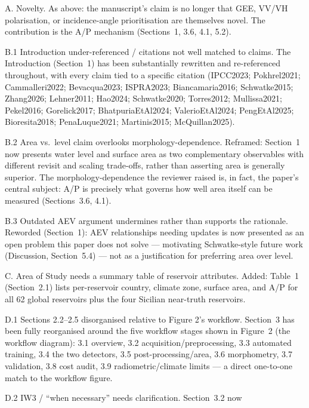 \documentclass[11pt]{article}
\begin{document}
\begin{resp}
  \item[A. Novelty.] As above: the manuscript's claim is no longer that GEE,
  VV/VH polarisation, or incidence-angle prioritisation are themselves novel.
  The contribution is the A/P mechanism (Sections~1, 3.6, 4.1, 5.2).
  \item[B.1 Introduction under-referenced / citations not well matched to
  claims.] The Introduction (Section~1) has been substantially rewritten and
  re-referenced throughout, with every claim tied to a specific citation
  (IPCC2023; Pokhrel2021; Cammalleri2022; Bevacqua2023; ISPRA2023;
  Biancamaria2016; Schwatke2015; Zhang2026; Lehner2011; Hao2024;
  Schwatke2020; Torres2012; Mullissa2021; Pekel2016; Gorelick2017;
  BhatpuriaEtAl2024; ValerioEtAl2024; PengEtAl2025; Bioresita2018;
  PenaLuque2021; Martinis2015; McQuillan2025).
  \item[B.2 Area vs.\ level claim overlooks morphology-dependence.] Reframed:
  Section~1 now presents water level and surface area as two complementary
  observables with different revisit and scaling trade-offs, rather than
  asserting area is generally superior. The morphology-dependence the
  reviewer raised is, in fact, the paper's central subject: A/P is precisely
  what governs how well area itself can be measured (Sections~3.6, 4.1).
  \item[B.3 Outdated AEV argument undermines rather than supports the
  rationale.] Reworded (Section~1): AEV relationships needing updates is now
  presented as an open problem this paper does not solve --- motivating
  Schwatke-style future work (Discussion, Section~5.4) --- not as a
  justification for preferring area over level.
  \item[C. Area of Study needs a summary table of reservoir attributes.]
  Added: Table~1 (Section~2.1) lists per-reservoir country,
  climate zone, surface area, and A/P for all 62 global reservoirs plus the
  four Sicilian near-truth reservoirs.
  \item[D.1 Sections 2.2--2.5 disorganised relative to Figure 2's
  workflow.] Section~3 has been fully reorganised around the five workflow
  stages shown in Figure~2 (the workflow diagram): 3.1 overview, 3.2
  acquisition/preprocessing, 3.3 automated training, 3.4 the two detectors,
  3.5 post-processing/area, 3.6 morphometry, 3.7 validation, 3.8 cost audit,
  3.9 radiometric/climate limits --- a direct one-to-one match to the
  workflow figure.
  \item[D.2 IW3 / ``when necessary'' needs clarification.] Section~3.2 now

\end{resp}
\end{document}
